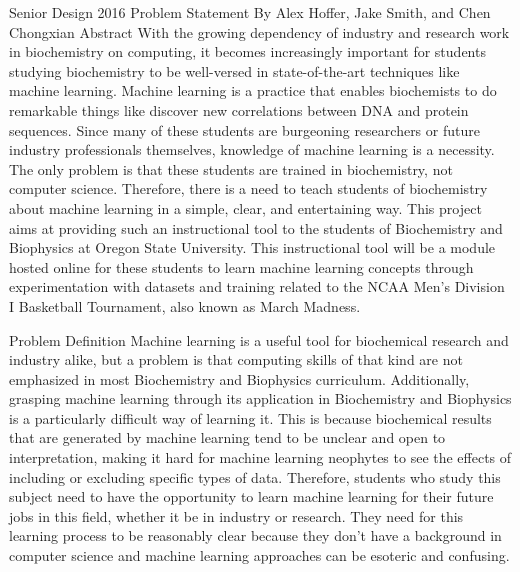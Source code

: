 \documentclass[letterpaper,20pt,titlepage]{article}
\begin{document}
\begin{center}

Senior Design 2016
\bigbreak
Problem Statement
\bigbreak
By Alex Hoffer, Jake Smith, and Chen Chongxian
\bigbreak
\quad \quad \quad \quad \quad \quad Abstract
\newline
\newline
With the growing dependency of industry and research work in biochemistry on computing, it becomes increasingly important for students studying biochemistry to be well-versed in state-of-the-art techniques like machine learning. Machine learning is a practice that enables biochemists to do remarkable things like discover new correlations between DNA and protein sequences. Since many of these students are burgeoning researchers or future industry professionals themselves, knowledge of machine learning is a necessity. The only problem is that these students are trained in biochemistry, not computer science. Therefore, there is a need to teach students of biochemistry about machine learning in a simple, clear, and entertaining way. This project aims at providing such an instructional tool to the students of Biochemistry and Biophysics at Oregon State University. This instructional tool will be a module hosted online for these students to learn machine learning concepts through experimentation with datasets and training related to the NCAA Men’s Division I Basketball Tournament, also known as March Madness. 
\newpage
\end{center}





\begin{section}{Problem Definition}
Machine learning is a useful tool for biochemical research and industry alike, but a problem is that computing skills of that kind are not emphasized in most Biochemistry and Biophysics curriculum. Additionally, grasping machine learning through its application in Biochemistry and Biophysics is a particularly difficult way of learning it. This is because biochemical results that are generated by machine learning tend to be unclear and open to interpretation, making it hard for machine learning neophytes to see the effects of including or excluding specific types of data. Therefore, students who study this subject need to have the opportunity to learn machine learning for their future jobs in this field, whether it be in industry or research. They need for this learning process to be reasonably clear because they don’t have a background in computer science and machine learning approaches can be esoteric and confusing. 
\end{section}
\end{document}
